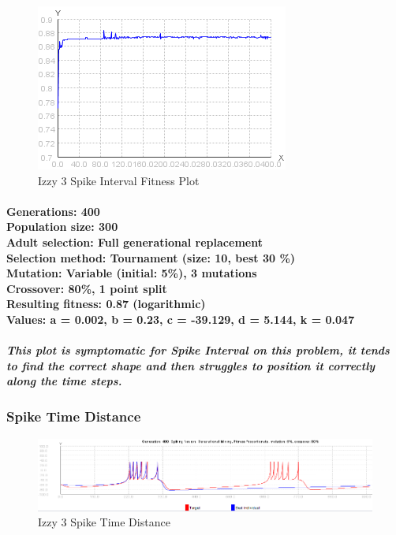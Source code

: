 \documentclass[titlepage,norsk]{article}
\begin{document}
\begin{figure}[h!]
\centering
\includegraphics[scale=0.75]{izzy3intervalFitness.png}
\caption{Izzy 3 Spike Interval Fitness Plot}
\label{fig:awesome_image}
\end{figure}

\paragraph{
Generations: 400\\
Population size: 300\\
Adult selection: Full generational replacement \\
Selection method: Tournament (size: 10, best 30 \%) \\
Mutation:  Variable (initial: 5\%), 3 mutations \\
Crossover: 80\%, 1 point split \\
Resulting fitness: 0.87 (logarithmic) \\
Values: a = 0.002, b = 0.23, c = -39.129, d = 5.144, k = 0.047 \\
}

\subparagraph{This plot is symptomatic for Spike Interval on this problem, it tends to find the correct shape and then struggles to position it correctly along the time steps.}

\subsubsection{Spike Time  Distance}

\begin{figure}[h!]
\centering
\includegraphics[scale=0.75]{izzy3spike.png}
\caption{Izzy 3 Spike Time Distance}
\label{fig:awesome_image}
\end{figure}
\end{document}
